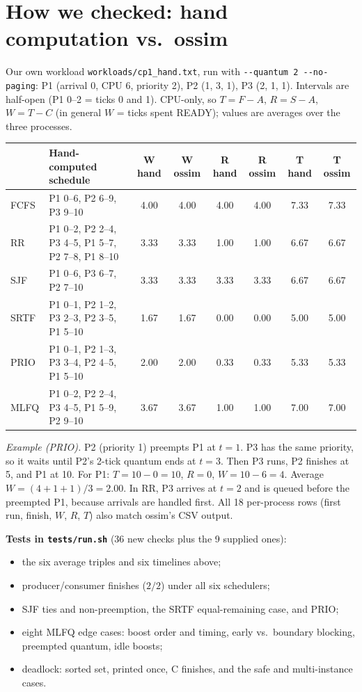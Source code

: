 \documentclass[10pt,a4paper]{article}
\newcommand{\code}[1]{\texttt{#1}}
\begin{document}
\section{How we checked: hand computation vs.\ ossim}
Our own workload \code{workloads/cp1\_hand.txt}, run with \code{-{}-quantum 2 -{}-no-paging}:
P1 (arrival 0, CPU 6, priority 2), P2 (1, 3, 1), P3 (2, 1, 1). Intervals are half-open (P1 0--2 = ticks 0 and 1).
CPU-only, so $T=F-A$, $R=S-A$, $W=T-C$ (in general $W$ = ticks spent READY); values are averages over the three processes.

\smallskip
{\small\setlength{\tabcolsep}{4pt}
\begin{tabularx}{\linewidth}{@{}l>{\raggedright\arraybackslash}Xcccccc@{}}
\toprule
 & \textbf{Hand-computed schedule} & \textbf{W hand} & \textbf{W ossim} & \textbf{R hand} & \textbf{R ossim} & \textbf{T hand} & \textbf{T ossim}\\
\midrule
FCFS & P1 0--6, P2 6--9, P3 9--10 & 4.00 & 4.00 & 4.00 & 4.00 & 7.33 & 7.33\\
RR   & P1 0--2, P2 2--4, P3 4--5, P1 5--7, P2 7--8, P1 8--10 & 3.33 & 3.33 & 1.00 & 1.00 & 6.67 & 6.67\\
SJF  & P1 0--6, P3 6--7, P2 7--10 & 3.33 & 3.33 & 3.33 & 3.33 & 6.67 & 6.67\\
SRTF & P1 0--1, P2 1--2, P3 2--3, P2 3--5, P1 5--10 & 1.67 & 1.67 & 0.00 & 0.00 & 5.00 & 5.00\\
PRIO & P1 0--1, P2 1--3, P3 3--4, P2 4--5, P1 5--10 & 2.00 & 2.00 & 0.33 & 0.33 & 5.33 & 5.33\\
MLFQ & P1 0--2, P2 2--4, P3 4--5, P1 5--9, P2 9--10 & 3.67 & 3.67 & 1.00 & 1.00 & 7.00 & 7.00\\
\bottomrule
\end{tabularx}}

\textit{Example (PRIO).} P2 (priority 1) preempts P1 at $t=1$. P3 has the same priority, so it waits until P2's
2-tick quantum ends at $t=3$. Then P3 runs, P2 finishes at 5, and P1 at 10. For P1: $T=10-0=10$, $R=0$, $W=10-6=4$.
Average $W=(4+1+1)/3=2.00$.
In RR, P3 arrives at $t=2$ and is queued before the preempted P1, because arrivals are handled first.
All 18 per-process rows (first run, finish, $W$, $R$, $T$) also match ossim's CSV output.

\textbf{Tests in \code{tests/run.sh}} (36 new checks plus the 9 supplied ones):
\begin{itemize}
\item the six average triples and six timelines above;
\item producer/consumer finishes ($2/2$) under all six schedulers;
\item SJF ties and non-preemption, the SRTF equal-remaining case, and PRIO;
\item eight MLFQ edge cases: boost order and timing, early vs.\ boundary blocking, preempted quantum, idle boosts;
\item deadlock: sorted set, printed once, C finishes, and the safe and multi-instance cases.
\end{itemize}
\end{document}
